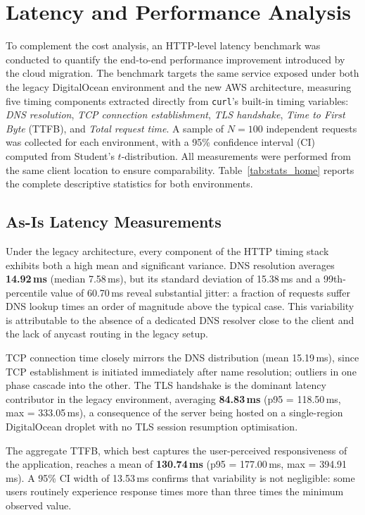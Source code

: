 \section{Latency and Performance Analysis}

To complement the cost analysis, an HTTP-level latency benchmark was conducted to
quantify the end-to-end performance improvement introduced by the cloud migration.
The benchmark targets the same service exposed under both the legacy
DigitalOcean environment and the new AWS architecture, measuring five timing
components extracted directly from \texttt{curl}'s built-in timing variables:
\emph{DNS resolution}, \emph{TCP connection establishment}, \emph{TLS handshake},
\emph{Time to First Byte} (TTFB), and \emph{Total request time}.
A sample of $N = 100$ independent requests was collected for each environment,
with a 95\% confidence interval (CI) computed from Student's $t$-distribution.
All measurements were performed from the same client location to ensure
comparability.
Table~\ref{tab:stats_home} reports the complete descriptive statistics for both
environments.



\subsection{As-Is Latency Measurements}

Under the legacy architecture, every component of the HTTP timing stack exhibits
both a high mean and significant variance.
DNS resolution averages \textbf{14.92\,ms} (median 7.58\,ms), but its standard
deviation of 15.38\,ms and a 99th-percentile value of 60.70\,ms reveal
substantial jitter: a fraction of requests suffer DNS lookup times an order of
magnitude above the typical case.
This variability is attributable to the absence of a dedicated DNS resolver
close to the client and the lack of anycast routing in the legacy setup.

TCP connection time closely mirrors the DNS distribution (mean 15.19\,ms), since
TCP establishment is initiated immediately after name resolution; outliers in one
phase cascade into the other.
The TLS handshake is the dominant latency contributor in the legacy environment,
averaging \textbf{84.83\,ms} (p95 = 118.50\,ms, max = 333.05\,ms), a consequence
of the server being hosted on a single-region DigitalOcean droplet with no
TLS session resumption optimisation.

The aggregate TTFB, which best captures the user-perceived
responsiveness of the application, reaches a mean of \textbf{130.74\,ms}
(p95 = 177.00\,ms, max = 394.91\,ms).
A 95\% CI width of 13.53\,ms confirms that variability is not negligible:
some users routinely experience response times more than three times the
minimum observed value.

